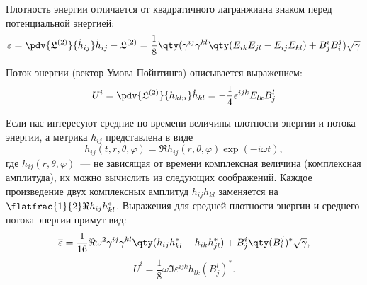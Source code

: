 \documentclass[\docroot/reports/draft/report.tex]{subfiles}
\begin{document}
    Плотность энергии отличается от квадратичного лагранжиана знаком перед потенциальной энергией:
    \begin{equation}\label{eq:eps}
        \varepsilon = \pdv{\mathfrak{L}^{(2)}}{\dot{h}_{ij}} \dot{h}_{ij} - \mathfrak{L}^{(2)}
                    = \frac{1}{8} \qty(
            \gamma^{ij} \gamma^{kl} \qty(
                E_{ik} E_{jl} - E_{ij} E_{kl}
            ) + B^i_j B^j_i
        ) \sqrt{\gamma}
    \end{equation}

    Поток энергии (вектор Умова-Пойнтинга) описывается выражением:
    \begin{equation}\label{eq:Uil}
        U^i = \pdv{\mathfrak{L}^{(2)}}{h_{kl;i}} \dot{h}_{kl}
            = -\frac{1}{4}\varepsilon^{ijk} E_{lk} B^l_j
    \end{equation}

    Если нас интересуют средние по времени величины плотности энергии и потока энергии, а метрика $h_{ij}$ представлена в виде
    \begin{equation*}
        h_{ij}(t,r,\theta,\varphi) = \Re{h_{ij}(r,\theta,\varphi)\exp(-i \omega t)},
    \end{equation*}
    где $h_{ij}(r,\theta,\varphi)$~--- не зависящая от времени комплексная величина (комплексная амплитуда), их можно вычислить из следующих соображений. Каждое произведение двух комплексных амплитуд $h_{ij} h_{kl}$ заменяется на $\flatfrac{1}{2} \Re{h_{ij} h^*_{kl}}$. Выражения для средней плотности энергии и среднего потока энергии примут вид:
    \begin{equation}\label{eq:epsm}
        \overline{\varepsilon} = \frac{1}{16} \Re{
            \omega^2 \gamma^{ij} \gamma^{kl} \qty(
                h_{ij} h^*_{kl} - h_{ik} h^*_{jl}
            ) + B^i_j \qty(B^j_i)^*
        } \sqrt{\gamma},
    \end{equation}
    \begin{equation}\label{eq:Uilm}
        \overline{U}^i = \frac{1}{8} \omega \Im{\varepsilon^{ijk} h_{lk} (B^l_j)^*} .
    \end{equation}
\end{document}
